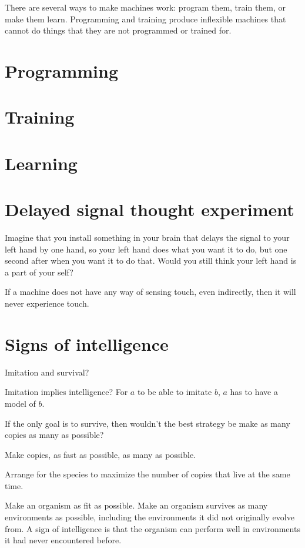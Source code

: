 There are several ways to make machines work:
program them, train them, or make them learn.
Programming and training produce inflexible machines
that cannot do things that they are not programmed or trained for.

\section{Programming}

\section{Training}

\section{Learning}

\section{Delayed signal thought experiment}

Imagine that you install something in your brain that delays the signal to your left hand by one hand,
so your left hand does what you want it to do, but one second after when you want it to do that.
Would you still think your left hand is a part of your self?

If a machine does not have any way of sensing touch, even indirectly,
then it will never experience touch.

\section{Signs of intelligence}

Imitation and survival?

Imitation implies intelligence?
For \(a\) to be able to imitate \(b\),
\(a\) has to have a model of \(b\).

If the only goal is to survive, then wouldn't the best strategy be
make as many copies as many as possible?

Make copies, as fast as possible, as many as possible.

Arrange for the species to maximize the number of copies that live at the same time.

Make an organism as fit as possible.
Make an organism survives as many environments as possible,
including the environments it did not originally evolve from.
A sign of intelligence is that the organism can
perform well in environments it had never encountered before.

